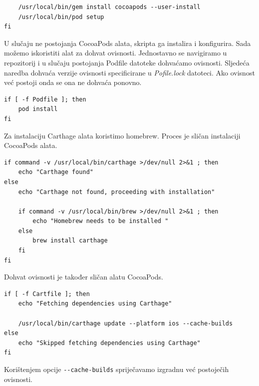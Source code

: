 \documentclass[times, utf8, diplomski, numeric]{fer}
\begin{document}
\begin{appendices}
\begin{verbatim}
    /usr/local/bin/gem install cocoapods --user-install
    /usr/local/bin/pod setup
fi
\end{verbatim}

U slučaju ne postojanja CocoaPods alata, skripta ga instalira i konfigurira. Sada možemo iskoristiti alat za dohvat ovisnosti. Jednostavno se navigiramo u repozitorij i u slučaju postojanja Podfile datoteke dohvaćamo ovisnosti. Sljedeća naredba dohvaća verzije ovisnosti specificirane u \textit{Pofile.lock} datoteci. Ako ovisnost već postoji onda se ona ne dohvaća ponovno.

\begin{verbatim}
if [ -f Podfile ]; then
    pod install
fi
\end{verbatim}

Za instalaciju Carthage alata koristimo homebrew. Proces je sličan instalaciji CocoaPods alata.

\begin{verbatim}
if command -v /usr/local/bin/carthage >/dev/null 2>&1 ; then
    echo "Carthage found"
else
    echo "Carthage not found, proceeding with installation"

    if command -v /usr/local/bin/brew >/dev/null 2>&1 ; then
        echo "Homebrew needs to be installed "
    else
        brew install carthage
    fi
fi
\end{verbatim}

Dohvat ovisnosti je također sličan alatu CocoaPods.

\begin{verbatim}
if [ -f Cartfile ]; then
    echo "Fetching dependencies using Carthage"

    /usr/local/bin/carthage update --platform ios --cache-builds
else
    echo "Skipped fetching dependencies using Carthage"
fi
\end{verbatim}

Korištenjem opcije \verb|--cache-builds| spriječavamo izgradnu već postoječih ovisnosti.
















\end{appendices}
\end{document}
